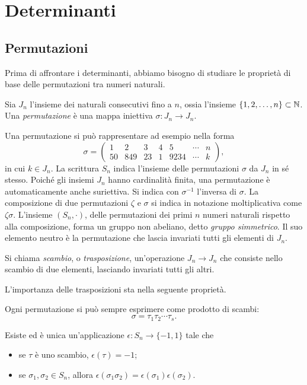 \chapter{Determinanti}
\section{Permutazioni} \label{sec:permutazioni}
Prima di affrontare i determinanti, abbiamo bisogno di studiare le proprietà di base delle permutazioni tra numeri naturali.
\begin{definizione} \label{d:permutazione}
	Sia $J_n$ l'insieme dei naturali consecutivi fino a $n$, ossia l'insieme $\{1,2,\dots,n\}\subset\mathbb{N}$.
	Una \emph{permutazione} è una mappa iniettiva $\sigma\colon J_n\to J_n$.
\end{definizione}
Una permutazione si può rappresentare ad esempio nella forma
\begin{equation*}
\sigma=\begin{pmatrix}1&2&3&4&5&\cdots&n\\50&849&23&1&9234&\cdots&k\end{pmatrix},
\end{equation*}
in cui $k\in J_n$.
La scrittura $S_n$ indica l'insieme delle permutazioni $\sigma$ da $J_n$ in sé stesso.
Poiché gli insiemi $J_n$ hanno cardinalità finita, una permutazione è automaticamente anche suriettiva.
Si indica con $\sigma^{-1}$ l'inversa di $\sigma$.
La composizione di due permutazioni $\zeta$ e $\sigma$ si indica in notazione moltiplicativa come $\zeta\sigma$.
L'insieme $(S_n,\cdot)$, delle permutazioni dei primi $n$ numeri naturali rispetto alla composizione, forma un gruppo non abeliano, detto \emph{gruppo simmetrico}.
Il suo elemento neutro è la permutazione che lascia invariati tutti gli elementi di $J_n$.
\begin{definizione} \label{d:scambio}
	Si chiama \emph{scambio}, o \emph{trasposizione}, un'operazione $J_n\to J_n$ che consiste nello scambio di due elementi, lasciando invariati tutti gli altri.
\end{definizione}
L'importanza delle trasposizioni sta nella seguente proprietà.
\begin{proprieta} \label{pr:permutazione-prodotto-scambi}
	Ogni permutazione si può sempre esprimere come prodotto di scambi:
	\begin{equation*}
		\sigma=\tau_1\tau_2\cdots\tau_s.
	\end{equation*}
\end{proprieta}
\begin{proprieta} \label{pr:segno}
	Esiste ed è unica un'applicazione $\epsilon\colon S_n\to\{-1,1\}$ tale che
	\begin{itemize}
		\item se $\tau$ è uno scambio, $\epsilon(\tau)=-1$;
		\item se $\sigma_1,\sigma_2\in S_n$, allora $\epsilon(\sigma_1\sigma_2)=\epsilon(\sigma_1)\epsilon(\sigma_2)$.
	\end{itemize}
\end{proprieta}
